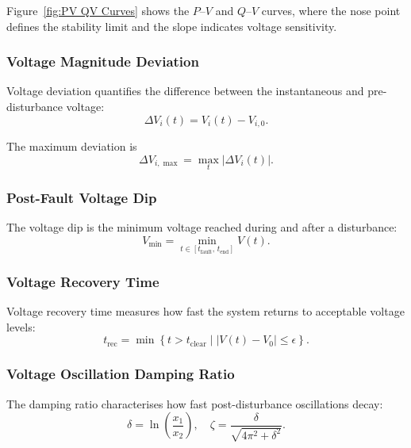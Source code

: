 Figure~\ref{fig:PV QV Curves} shows the $P$--$V$ and $Q$--$V$ curves, where the nose point defines the stability limit and the slope indicates voltage sensitivity.

\subsubsection{Voltage Magnitude Deviation}

Voltage deviation quantifies the difference between the instantaneous and pre-disturbance voltage:
\begin{equation}
\Delta V_i(t) = V_i(t) - V_{i,0}.
\end{equation}

The maximum deviation is
\begin{equation}
\Delta V_{i,\max} = \max_t \left| \Delta V_i(t) \right|.
\end{equation}

\subsubsection{Post-Fault Voltage Dip}

The voltage dip is the minimum voltage reached during and after a disturbance:
\begin{equation}
V_{\min} = \min_{t \in [t_{\mathrm{fault}},\, t_{\mathrm{end}}]} V(t).
\end{equation}

\subsubsection{Voltage Recovery Time}

Voltage recovery time measures how fast the system returns to acceptable voltage levels:
\begin{equation}
t_{\mathrm{rec}} = 
\min \left\{ t > t_{\mathrm{clear}} \;\big|\; \left| V(t) - V_0 \right| \leq \epsilon \right\}.
\end{equation}

\subsubsection{Voltage Oscillation Damping Ratio}

The damping ratio characterises how fast post-disturbance oscillations decay:
\begin{equation}
\delta = \ln\left( \frac{x_1}{x_2} \right), \quad
\zeta = \frac{\delta}{\sqrt{4\pi^2 + \delta^2}}.
\end{equation}

